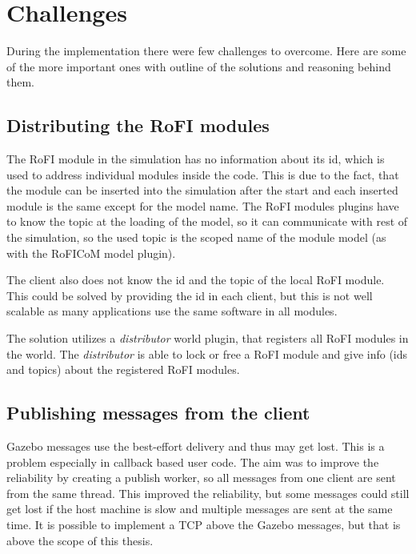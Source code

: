 \documentclass[
  digital, %
  table,   %
  oneside, %
  nolof,     %
  nolot,     %
]{fithesis3}
\begin{document}
\section{Challenges}

During the implementation there were few challenges to overcome.
Here are some of the more important ones with outline of the solutions and reasoning behind them.

\subsection{Distributing the RoFI modules}

The RoFI module in the simulation has no information about its id, which is used to address individual modules inside the code.
This is due to the fact, that the module can be inserted into the simulation after the start and each inserted module is the same except for the model name.
The RoFI modules plugins have to know the topic at the loading of the model, so it can communicate with rest of the simulation, so the used topic is the scoped name of the module model (as with the RoFICoM model plugin).

The client also does not know the id and the topic of the local RoFI module.
This could be solved by providing the id in each client, but this is not well scalable as many applications use the same software in all modules.

The solution utilizes a \emph{distributor} world plugin, that registers all RoFI modules in the world.
The \emph{distributor} is able to lock or free a RoFI module and give info (ids and topics) about the registered RoFI modules.

\subsection{Publishing messages from the client}

Gazebo messages use the best-effort delivery and thus may get lost.
This is a problem especially in callback based user code.
The aim was to improve the reliability by creating a publish worker, so all messages from one client are sent from the same thread.
This improved the reliability, but some messages could still get lost if the host machine is slow and multiple messages are sent at the same time.
It is possible to implement a TCP above the Gazebo messages, but that is above the scope of this thesis.
\end{document}
